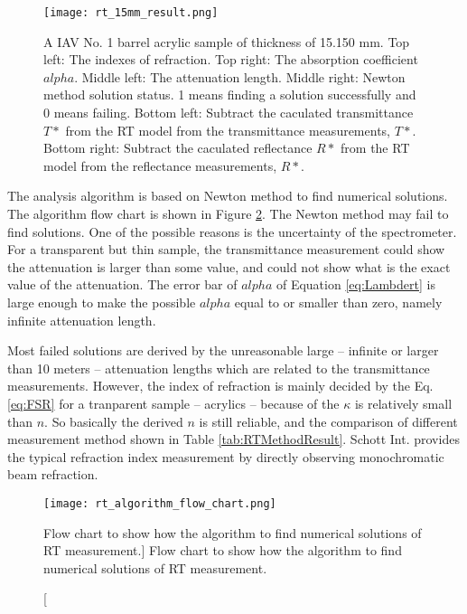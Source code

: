\begin{figure}[p]
    \centering
    \texttt{[image: rt\_15mm\_result.png]}
    \caption[Result of RT method of 15 mm acrylic sample]
{A IAV No. 1 barrel acrylic sample of thickness of 15.150 mm.
Top left: The indexes of refraction.
Top right: The absorption coefficient $alpha$.
Middle left: The attenuation length.
Middle right: Newton method solution status. 1 means finding a solution successfully and 0 means failing.
Bottom left: Subtract the caculated transmittance $T*$ from the RT model from the transmittance measurements, $T*$.
Bottom right: Subtract the caculated reflectance $R*$ from the RT model from the reflectance measurements, $R*$.
}
    \label{fig:rt_15mm_result.png}
    \end{figure}

The analysis algorithm is based on Newton method to find numerical solutions.
The algorithm flow chart is shown in Figure \ref{fig:rt_algorithm_flow_chart.png}.
The Newton method  may fail to find solutions. One of the possible reasons is the uncertainty of the spectrometer.
For a transparent but thin sample, the transmittance measurement could show the attenuation
is larger than some value, and could not show what is the exact value of the attenuation.
The error bar of ${alpha}$ of Equation \ref{eq:Lambdert} is large enough to make
the possible ${alpha}$ equal to or smaller than zero, namely infinite attenuation length.

Most failed solutions are derived by the unreasonable large -- infinite or larger than 10 meters --
attenuation lengths which are related to the transmittance measurements.
However, the index of refraction is mainly decided by the Eq. \ref{eq:FSR} for a tranparent sample -- acrylics -- because
of the $\kappa$ is relatively small than $n$. So basically the derived $n$ is still reliable, and the comparison
of different measurement method shown in Table \ref{tab:RTMethodResult}.
Schott Int. provides the typical refraction index measurement by directly observing monochromatic beam refraction.




\begin{figure}
    \centering
    \texttt{[image: rt\_algorithm\_flow\_chart.png]}
    \caption
    [Flow chart to show how the algorithm to find numerical solutions of RT measurement.]
    {Flow chart to show how the algorithm to find numerical solutions of RT measurement.}
    \label{fig:rt_algorithm_flow_chart.png}
    \end{figure}


